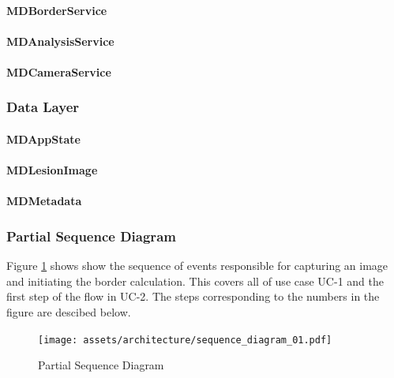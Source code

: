         \paragraph{MDBorderService}
            
        \paragraph{MDAnalysisService}
            
        \paragraph{MDCameraService}
            


    \subsubsection{Data Layer}

        \paragraph{MDAppState}
            
        \paragraph{MDLesionImage}
            
        \paragraph{MDMetadata}
            

    \normalsize

    \subsubsection{Partial Sequence Diagram }

        Figure \ref{fig:seq_dia} shows show the sequence of events responsible for capturing an image and initiating the border calculation. This covers all of use case UC-1 and the first step of the flow in UC-2. The steps corresponding to the numbers in the figure are descibed below.

        \begin{figure}[H]
            \centering
            \texttt{[image: assets/architecture/sequence\_diagram\_01.pdf]}
            \caption{Partial Sequence Diagram}
            \label{fig:seq_dia}
        \end{figure}

